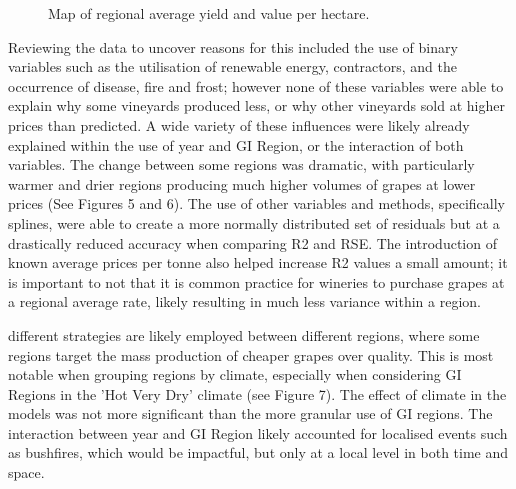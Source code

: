 \documentclass[review,12pt,authoryear]{elsarticle}
\begin{document}
\begin{linenumbers}
\begin{figure}
  \caption{Map of regional average yield and value per hectare.}
\end{figure}
%
%
%
 Reviewing the data to uncover reasons for this included the use of binary variables such as the utilisation of renewable energy, contractors, and the occurrence of disease, fire and frost; however none of these variables were able to explain why some vineyards produced less, or why other vineyards sold at higher prices than predicted. A wide variety of these influences were likely already explained within the use of year and GI Region, or the interaction of both variables. The change between some regions was dramatic, with particularly warmer and drier regions producing much higher volumes of grapes at lower prices (See Figures 5 and 6). The use of other variables and methods, specifically splines, were able to create a more normally distributed set of residuals but at a drastically reduced accuracy when comparing R2 and RSE. The introduction of known average prices per tonne also helped increase R2 values a small amount; it is important to not that it is common practice for wineries to purchase grapes at a regional average rate, likely resulting in much less variance within a region.

different strategies are likely employed between different regions, where some regions target the mass production of cheaper grapes over quality. This is most notable when grouping regions by climate, especially when considering GI Regions in the 'Hot Very Dry' climate (see Figure 7). The effect of climate in the models was not more significant than the more granular use of GI regions. The interaction between year and GI Region likely accounted for localised events such as bushfires, which would be impactful, but only at a local level in both time and space.


\end{linenumbers}
\end{document}

